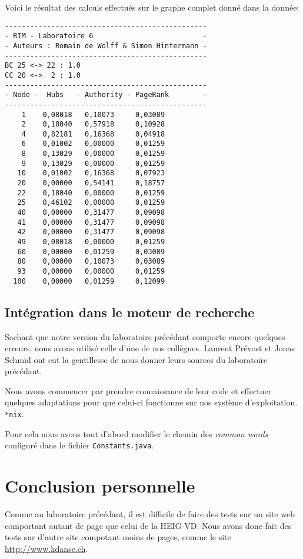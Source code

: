 \documentclass[a4paper, 11pt]{article}
\begin{document}
Voici le résultat des calculs effectués sur le graphe complet donné dans la
donnée:

\begin{verbatim}
------------------------------------------------
- RIM - Laboratoire 6                          -
- Auteurs : Romain de Wolff & Simon Hintermann -
------------------------------------------------
BC 25 <-> 22 : 1.0
CC 20 <->  2 : 1.0
------------------------------------------------
- Node -  Hubs   - Authority - PageRank        -
------------------------------------------------
    1    0,08018   0,10073     0,03089
    2    0,18040   0,57918     0,10928
    4    0,82181   0,16368     0,04918
    6    0,01002   0,00000     0,01259
    8    0,13029   0,00000     0,01259
    9    0,13029   0,00000     0,01259
   10    0,01002   0,16368     0,07923
   20    0,00000   0,54141     0,18757
   22    0,18040   0,00000     0,01259
   25    0,46102   0,00000     0,01259
   40    0,00000   0,31477     0,09098
   41    0,00000   0,31477     0,09098
   42    0,00000   0,31477     0,09098
   49    0,08018   0,00000     0,01259
   60    0,00000   0,01259     0,03089
   80    0,00000   0,10073     0,03089
   93    0,00000   0,00000     0,01259
  100    0,00000   0,01259     0,12099
\end{verbatim}

\subsection{Intégration dans le moteur de recherche}

Sachant que notre version du laboratoire précédant comporte encore quelques
erreurs, nous avons utilisé celle d'une de nos collègues. Laurent Prévost et
Jonas Schmid ont eut la gentillesse de nous donner leurs sources du laboratoire
précédant.

Nous avons commencer par prendre connaissance de leur code et effectuer quelques
adaptations pour que celui-ci fonctionne sur nos système d'exploitation.
\texttt{*nix}.

Pour cela nous avons tout d'abord modifier le chemin des
\textit{common words} configuré dans le fichier \texttt{Constants.java}. 

\section{Conclusion personnelle} 

Comme au laboratoire précédant, il est difficile de faire des tests sur un site
web comportant autant de page que celui de la HEIG-VD. Nous avons donc fait des
tests sur d'autre site compotant moins de pages, comme le site
\url{http://www.kdanse.ch}.



\end{document}

